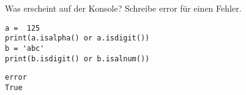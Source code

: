 \question[2] Was erscheint auf der Konsole? Schreibe error für einen Fehler.
\begin{lstlisting}
a =  125
print(a.isalpha() or a.isdigit())
b = 'abc'
print(b.isdigit() or b.isalnum())
\end{lstlisting}
\begin{solutionbox}{2cm}
\begin{lstlisting}
error
True
\end{lstlisting}
\end{solutionbox}
